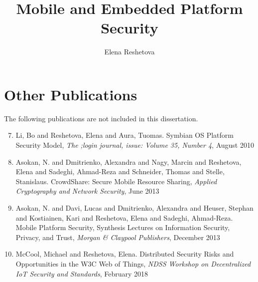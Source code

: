 \documentclass[dissertation,math,vertlayout]{aaltoseries}
\author{Elena Reshetova}
\title{Mobile and Embedded Platform Security}
\begin{document}
\draftabstract{\lipsum[1-3]}




\clearpage
\tableofcontents


\listofpublications

\chapter*{Other Publications}%
%
The following publications are not included in this dissertation.
\begin{enumerate}%
		\setcounter{enumi}{6}
		\renewcommand{\labelenumi}{\bfseries\Roman{enumi}}%
		  \item Li, Bo and Reshetova, Elena and Aura, Tuomas. Symbian OS Platform Security Model, \textit{The ;login journal, issue: 
Volume 35, Number 4}, August 2010
			\item Asokan, N. and Dmitrienko, Alexandra and Nagy, Marcin and Reshetova, Elena and Sadeghi, Ahmad-Reza and Schneider, Thomas and Stelle, Stanislaus. CrowdShare: Secure Mobile Resource Sharing, \textit{Applied Cryptography and Network Security}, June 2013
			\item Asokan, N. and Davi, Lucas and Dmitrienko, Alexandra and Heuser, Stephan and Kostiainen, Kari and Reshetova, Elena and Sadeghi, Ahmad-Reza. Mobile Platform Security, Synthesis Lectures on Information Security, Privacy, and Trust, \textit{Morgan \& Claypool Publishers}, December 2013
			\item McCool, Michael and Reshetova, Elena. Distributed Security Risks and Opportunities in the W3C Web of Things, \textit{NDSS Workshop on Decentralized IoT Security and Standards}, February 2018
\end{enumerate}%
		
\end{document}
